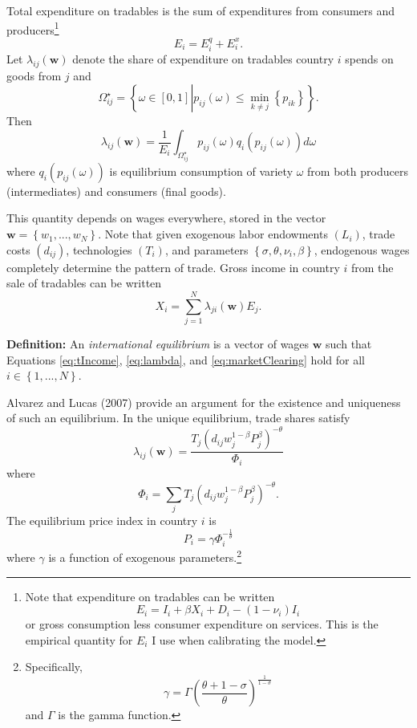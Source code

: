 \documentclass{puthesis}
\begin{document}
Total expenditure on tradables is the sum of expenditures from consumers
and producers\footnote{Note that expenditure on tradables can be written
  \[E_i = I_i + \beta X_i + D_i - (1 - \nu_i) I_i \] or gross
  consumption less consumer expenditure on services. This is the
  empirical quantity for \(E_i\) I use when calibrating the model.} \[
E_i = E_i^q + E_i^x .
\] Let \(\lambda_{ij}(\bm{w})\) denote the share of expenditure on
tradables country \(i\) spends on goods from \(j\) and \[
\Omega_{ij}^\star = \left\{ \omega \in [0,1] \left. \right\vert p_{ij}(\omega) \leq \min_{k \neq j} \left\{ p_{ik} \right\} \right\} .
\] Then \begin{equation} \label{eq:lambda}
\lambda_{ij}(\bm{w}) = \frac{1}{E_i} \int_{\Omega_{ij}^\star} p_{ij}(\omega) q_i \left( p_{ij} (\omega) \right) d \omega
\end{equation} where \(q_i \left( p_{ij} (\omega) \right)\) is
equilibrium consumption of variety \(\omega\) from both producers
(intermediates) and consumers (final goods).

This quantity depends on wages everywhere, stored in the vector
\(\bm{w} = \left\{ w_1, ..., w_N \right\}\). Note that given exogenous
labor endowments \((L_i)\), trade costs \((d_{ij})\), technologies
\((T_i)\), and parameters
\(\left\{ \sigma, \theta, \nu_i, \beta \right\}\), endogenous wages
completely determine the pattern of trade. Gross income in country \(i\)
from the sale of tradables can be written
\begin{equation} \label{eq:marketClearing}
X_i = \sum_{j=1}^N \lambda_{ji}(\bm{w}) E_j .
\end{equation}

\textbf{Definition:} An \emph{international equilibrium} is a vector of
wages \(\bm{w}\) such that Equations \ref{eq:tIncome}, \ref{eq:lambda},
and \ref{eq:marketClearing} hold for all
\(i \in \left\{1, ..., N \right\}\).

Alvarez and Lucas (2007) provide an argument for the existence and
uniqueness of such an equilibrium. In the unique equilibrium, trade
shares satisfy \begin{equation} \label{eq:Gravity}
\lambda_{ij}(\bm{w}) = \frac{ T_j \left( d_{ij} w_j^{1 - \beta} P_j^{\beta} \right)^{- \theta} }{\Phi_i}
\end{equation} where \[
\Phi_i =  \sum_j T_j \left( d_{ij} w_j^{1 - \beta} P_j^{\beta} \right)^{- \theta} .
\] The equilibrium price index in country \(i\) is
\begin{equation} \label{eq:eqP}
P_i = \gamma \Phi_i^{ - \frac{1}{\theta} }
\end{equation} where \(\gamma\) is a function of exogenous
parameters.\footnote{Specifically,
  \[\gamma = \Gamma \left( \frac{\theta + 1 - \sigma}{\theta} \right)^{ \frac{1}{1 - \sigma} }\]
  and \(\Gamma\) is the gamma function.}
\end{document}
